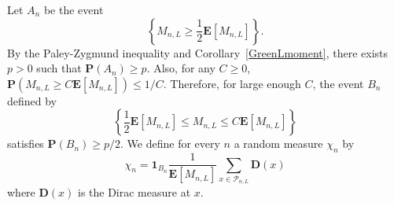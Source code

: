 \documentclass{amsart}
\newtheorem{lem}[thm]{Lemma}
\theoremstyle{definition}
\theoremstyle{remark}
\begin{document}
Let $A_n$ be the event
$$\left \{M_{n,L}\geq \frac{1}{2}\mathbf E[M_{n,L}]\right \}.$$
By the Paley-Zygmund inequality and Corollary~\ref{GreenLmoment}, there exists $p>0$ such that
$\mathbf P(A_n)\geq p$.
Also, for any $C\geq 0$,
$\mathbf P(M_{n,L}\geq C\mathbf E[M_{n,L}])\leq 1/C$.
Therefore, for large enough $C$, the event $B_n$ defined by
$$\left \{\frac{1}{2}\mathbf E[M_{n,L}]\leq M_{n,L}\leq C\mathbf E[M_{n,L}]\right \}$$
satisfies $\mathbf P(B_n)\geq p/2$.
We define for every $n$ a random measure $\chi_n$ by
\begin{equation}\label{defchin}
  \chi_n = \mathbf 1_{B_n}\frac{1}{\mathbf{E} \left[ M_{n, L} \right]} \sum_{x \in \mathcal{P}_{n, L}}\mathbf D(x)
\end{equation}
where $\mathbf D(x)$ is the Dirac measure at $x$.




\end{document}

